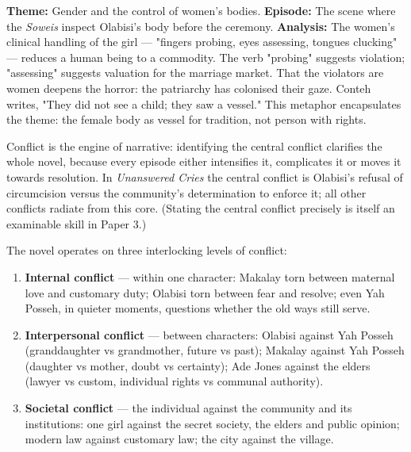 \documentclass[11pt]{article}
\newcommand{\cle}[1]{{\popxbold\color{popdark}#1}}
\newcounter{popsec}
\newcounter{popsub}
\newcommand{\courssub}[1]{%
  \stepcounter{popsub}%
  \par\vspace{9pt}\noindent{\popxbold\fontsize{11.5}{13}\selectfont\color{popink}{\color{poporange}\thepopsec.\thepopsub}\hspace{6pt}#1}\par\nopagebreak\vspace{4pt}
}
\begin{document}
\begin{exemplebox}
\textbf{Theme:} Gender and the control of women's bodies.
\textbf{Episode:} The scene where the \emph{Soweis} inspect Olabisi's body before the ceremony.
\textbf{Analysis:} The women's clinical handling of the girl --- "fingers probing, eyes assessing, tongues clucking" --- reduces a human being to a commodity. The verb "probing" suggests violation; "assessing" suggests valuation for the marriage market. That the violators are women deepens the horror: the patriarchy has colonised their gaze. Conteh writes, "They did not see a child; they saw a vessel." This metaphor encapsulates the theme: the female body as vessel for tradition, not person with rights.
\end{exemplebox}

\courssub{Conflict in the Novel}

\begin{propriete}
Conflict is the engine of narrative: \cle{identifying the central conflict clarifies the whole novel}, because every episode either intensifies it, complicates it or moves it towards resolution. In \emph{Unanswered Cries} the central conflict is Olabisi's refusal of circumcision versus the community's determination to enforce it; all other conflicts radiate from this core. (Stating the central conflict precisely is itself an examinable skill in Paper 3.)
\end{propriete}

The novel operates on three interlocking levels of conflict:

\begin{enumerate}
\item \textbf{Internal conflict} --- within one character: Makalay torn between maternal love and customary duty; Olabisi torn between fear and resolve; even Yah Posseh, in quieter moments, questions whether the old ways still serve.
\item \textbf{Interpersonal conflict} --- between characters: Olabisi against Yah Posseh (granddaughter vs grandmother, future vs past); Makalay against Yah Posseh (daughter vs mother, doubt vs certainty); Ade Jones against the elders (lawyer vs custom, individual rights vs communal authority).
\item \textbf{Societal conflict} --- the individual against the community and its institutions: one girl against the secret society, the elders and public opinion; modern law against customary law; the city against the village.
\end{enumerate}
\end{document}
